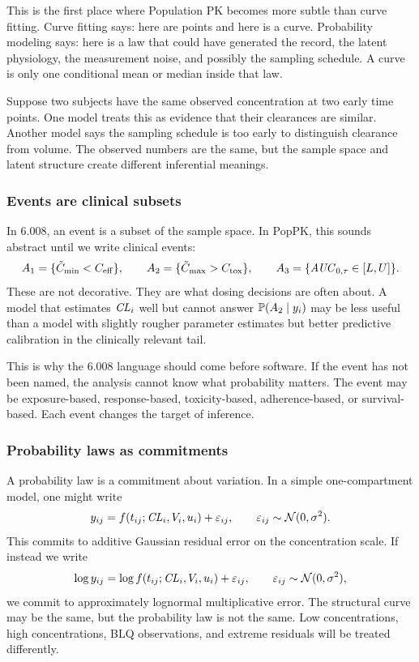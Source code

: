This is the first place where Population PK becomes more subtle than curve fitting.  Curve fitting says: here are points and here is a curve.  Probability modeling says: here is a law that could have generated the record, the latent physiology, the measurement noise, and possibly the sampling schedule.  A curve is only one conditional mean or median inside that law.

\begin{eg}
  Suppose two subjects have the same observed concentration at two early time points.  One model treats this as evidence that their clearances are similar.  Another model says the sampling schedule is too early to distinguish clearance from volume.  The observed numbers are the same, but the sample space and latent structure create different inferential meanings.
\end{eg}

\subsubsection*{Events are clinical subsets}

In 6.008, an event is a subset of the sample space.  In PopPK, this sounds abstract until we write clinical events:
\[
  A_1=\{\tilde C_{\min}<C_{\mathrm{eff}}\},
  \qquad
  A_2=\{\tilde C_{\max}>C_{\mathrm{tox}}\},
  \qquad
  A_3=\{\pksym{AUC}_{0,\tau}\in[L,U]\}.
\]
These are not decorative.  They are what dosing decisions are often about.  A model that estimates \(\pksym{CL}_i\) well but cannot answer \(\mathbb{P}(A_2\mid y_i)\) may be less useful than a model with slightly rougher parameter estimates but better predictive calibration in the clinically relevant tail.

This is why the 6.008 language should come before software.  If the event has not been named, the analysis cannot know what probability matters.  The event may be exposure-based, response-based, toxicity-based, adherence-based, or survival-based.  Each event changes the target of inference.

\subsubsection*{Probability laws as commitments}

A probability law is a commitment about variation.  In a simple one-compartment model, one might write
\[
  y_{ij}=f(t_{ij};\pksym{CL}_i,V_i,u_i)+\varepsilon_{ij},
  \qquad
  \varepsilon_{ij}\sim\Normal(0,\sigma^2).
\]
This commits to additive Gaussian residual error on the concentration scale.  If instead we write
\[
  \log y_{ij}=\log f(t_{ij};\pksym{CL}_i,V_i,u_i)+\varepsilon_{ij},
  \qquad
  \varepsilon_{ij}\sim\Normal(0,\sigma^2),
\]
we commit to approximately lognormal multiplicative error.  The structural curve may be the same, but the probability law is not the same.  Low concentrations, high concentrations, BLQ observations, and extreme residuals will be treated differently.


